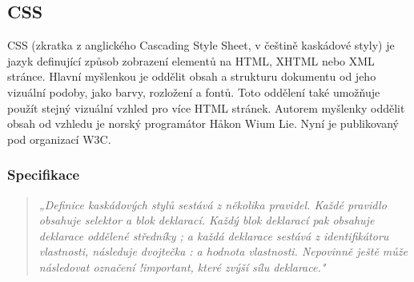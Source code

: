 \documentclass[main.tex]{subfiles}
\begin{document}
\subsection{CSS}
\label{css}
CSS (zkratka z anglického Cascading Style Sheet, v češtině kaskádové styly) je jazyk definující způsob zobrazení elementů na HTML, XHTML nebo XML stránce. Hlavní myšlenkou je oddělit obsah a strukturu dokumentu od jeho vizuální podoby, jako barvy, rozložení a fontů. Toto oddělení také umožňuje použít stejný vizuální vzhled pro více HTML stránek. Autorem myšlenky oddělit obsah od vzhledu je norský programátor Håkon Wium Lie. Nyní je publikovaný pod organizací W3C.  

\subsubsection{Specifikace}
\begin{quote} \textit{„Definice kaskádových stylů sestává z několika pravidel. Každé pravidlo obsahuje selektor a blok deklarací. Každý blok deklarací pak obsahuje deklarace oddělené středníky ; a každá deklarace sestává z identifikátoru vlastnosti, následuje dvojtečka : a hodnota vlastnosti. Nepovinně ještě může následovat označení !important, které zvýší sílu deklarace."} \cite{web:wik:cz:css} \end{quote} 
\end{document}
